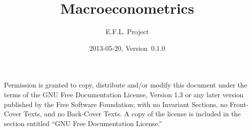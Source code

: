 \documentclass[nofonts,notitlepage]{tufte-latex/tufte-handout}
\title{Macroeconometrics}
\author{E.F.L. Project}
\date{2013-05-20, Version~0.1.0}
\begin{document}
\maketitle
\tableofcontents

  Permission is granted to
copy, distribute and/or modify this document under the terms of the
GNU Free Documentation License, Version 1.3 or any later version
published by the Free Software Foundation; with no Invariant Sections,
no Front-Cover Texts, and no Back-Cover Texts.  A copy of the license
is included in the section entitled ``GNU Free Documentation
License.''






\appendix

\end{document}
